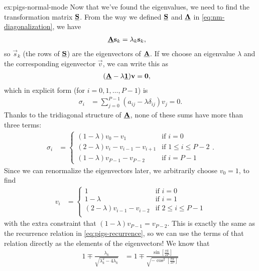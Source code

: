 \begin{DefAnswer}{ex:pigs-normal-mode}
	Now that we've found the eigenvalues, we need to find the transformation matrix $\underline{\bm{\mathbf{S}}}$.
	From the way we defined $\underline{\bm{\mathbf{S}}}$ and $\underline{\bm{\mathbf{\Lambda}}}$ in \cref{eq:nm-diagonalization}, we have
	\begin{align}
		\underline{\bm{\mathbf{A}}} \bm{\mathbf{s}}_k
		&= \lambda_k \bm{\mathbf{s}}_k,
	\end{align}
	so $\vec{s}_k$ (the rows of $\underline{\bm{\mathbf{S}}}$) are the eigenvectors of $\underline{\bm{\mathbf{A}}}$.
	If we choose an eigenvalue $\lambda$ and the corresponding eigenvector $\vec{v}$, we can write this as
	\begin{align}
		(\underline{\bm{\mathbf{A}}} - \lambda \underline{\bm{\mathbf{1}}}) \bm{\mathbf{v}}
		&= \bm{\mathbf{0}},
	\end{align}
	which in explicit form (for $i = 0, 1, \ldots, P - 1$) is
	\begin{align}
		\sigma_i
		&= \sum_{j=0}^{P-1} (a_{ij} - \lambda \delta_{ij}) v_j
		= 0.
	\end{align}
	Thanks to the tridiagonal structure of $\underline{\bm{\mathbf{A}}}$, none of these sums have more than three terms:
	\begin{align}
		\sigma_i
		&= \begin{cases}
				(1 - \lambda) v_0 - v_1 & \text{if } i = 0 \\
				(2 - \lambda) v_i - v_{i-1} - v_{i+1} & \text{if } 1 \le i \le P - 2 \\
				(1 - \lambda) v_{P-1} - v_{P-2} & \text{if } i = P - 1
			\end{cases}.
	\end{align}
	Since we can renormalize the eigenvectors later, we arbitrarily choose $v_0 = 1$, to find
	\begin{align}
		v_i
		&= \begin{cases}
				1 & \text{if } i = 0 \\
				1 - \lambda & \text{if } i = 1 \\
				(2 - \lambda) v_{i-1} - v_{i-2} & \text{if } 2 \le i \le P - 1 \\
			\end{cases}
	\end{align}
	with the extra constraint that $(1 - \lambda) v_{P-1} = v_{P-2}$.
	This is exactly the same as the recurrence relation in \cref{eq:pigs-recurrence}, so we can use the terms of that relation directly as the elements of the eigenvectors!
	We know that
	\begin{subequations}
	\begin{align}
		1 \mp \frac{\lambda_k}{\sqrt{\lambda_k^2 - 4 \lambda_k}}
		&= 1 \mp \frac{\sin{\left[ \frac{\pi k}{2 P} \right]}}{\sqrt{-\cos^2{\left[ \frac{\pi k}{2 P} \right]}}}

\end{align}
\end{subequations}
\end{DefAnswer}
